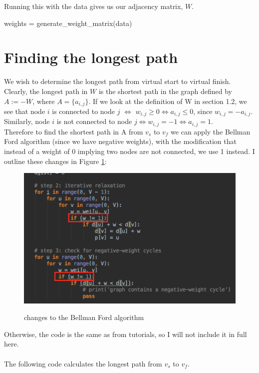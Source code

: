 \documentclass[paper=a4, fontsize=12pt]{scrartcl} %
\numberwithin{equation}{section}       %
\numberwithin{figure}{section}         %
\numberwithin{table}{section}          %
\begin{document}
Running this with the data gives us our adjacency matrix, $W$.

\begin{python}
weights = generate_weight_matrix(data)
\end{python}

\section{Finding the longest path}

We wish to determine the longest path from virtual start to virtual finish. Clearly, the longest path in $W$ is the shortest path in the graph defined by $A:=-W$, where $A = \{a_{i,j} \}$. If we look at the definition of W in section 1.2, we see that node $i$ is connected to node $j$ $\iff$ $w_{i,j} \geq 0 \iff a_{i,j} \leq 0$, since $w_{i,j} = -a_{i,j}$. Similarly, node $i$ is not connected to node $j \iff w_{i,j} = -1 \iff a_{i,j} = 1$. \\
Therefore to find the shortest path in A from $v_{s}$ to $v_{f}$ we can apply the Bellman Ford algorithm (since we have negative weights), with the modification that instead of a weight of 0 implying two nodes are not connected, we use 1 instead. I outline these changes in Figure \ref{changes}:

\begin{figure}[h]
\caption{changes to the Bellman Ford algorithm}
\centering
\includegraphics{changes}\label{changes}
\end{figure}

Otherwise, the code is the same as from tutorials, so I will not include it in full here.\\ \\
The following code calculates the longest path from $v_{s}$ to $v_{f}$.
\end{document}
